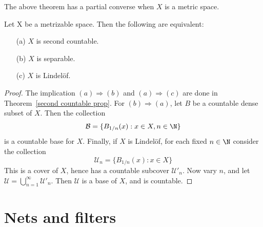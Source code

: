 The above theorem has a partial converse when $X$ is a metric space.
\begin{theorem}\label{metric space second countable iff}
Let X be a metrizable space. Then the following are equivalent:
\begin{itemize}
\item[(a)] $X$ is second countable.
\item[(b)] $X$ is separable.
\item[(c)] $X$ is Lindel\"of.
\end{itemize}
\end{theorem}
\begin{proof}
The implication $(a)\Rightarrow(b)$ and $(a)\Rightarrow(c)$ are done in Theorem~\ref{second countable prop}. For $(b)\Rightarrow(a)$, let $B$ be a countable dense subset of $X$. Then the collection 
\[\mathcal{B}=\{B_{1/n}(x):x\in X,n\in\N\}\]
is a countable base for $X$. Finally, if $X$ is Lindel\"of, for each fixed $n\in\N$ consider the collection
\[\mathcal{U}_n=\{B_{1/n}(x):x\in X\}\]
This is a cover of $X$, hence has a countable subcover $\mathcal{U}'_n$. Now vary $n$, and let $\mathcal{U}=\bigcup_{n=1}^{\infty}\mathcal{U}'_n$. Then $\mathcal{U}$ is a base of $X$, and is countable.
\end{proof}
\section{Nets and filters}
